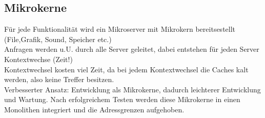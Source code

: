 \documentclass[a4paper]{article}
\begin{document}
\subsection{Mikrokerne}
Für jede Funktionalität wird ein Mikroserver mit Mikrokern bereitsestellt (File,Grafik, Sound, Speicher etc.)\\
Anfragen werden u.U. durch alle Server geleitet, dabei entstehen für jeden Server Kontextwechse (Zeit!)\\
Kontextwechsel kosten viel Zeit, da bei jedem Kontextwechsel die Caches kalt werden, also keine Treffer besitzen.\\
Verbesserter Ansatz: Entwicklung als Mikrokerne, dadurch leichterer Entwicklung und Wartung. Nach erfolgreichem Testen werden diese Mikrokerne in einen Monolithen integriert und die Adressgrenzen aufgehoben.\\
\end{document}

